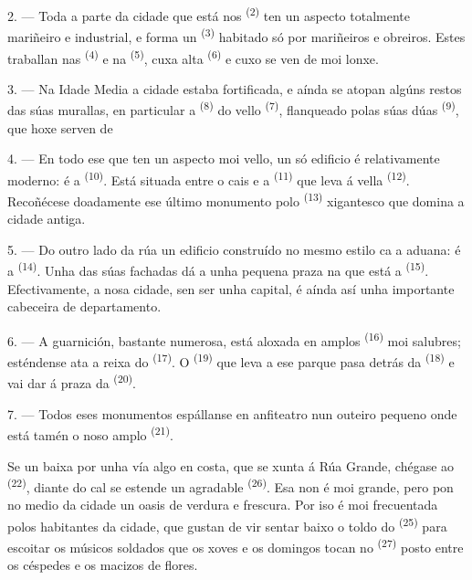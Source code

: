 2. --- Toda a parte da cidade que está nos  \textsuperscript{(2)} ten un
aspecto totalmente mariñeiro e industrial, e forma un 
\textsuperscript{(3)} habitado só por mariñeiros e obreiros. Estes traballan nas
 \textsuperscript{(4)} e na 
\textsuperscript{(5)}, cuxa alta  \textsuperscript{(6)} e cuxo
 se ven de moi lonxe.

3. --- Na Idade Media a cidade estaba fortificada, e aínda se atopan algúns restos das
súas murallas, en particular a  \textsuperscript{(8)} do vello
 \textsuperscript{(7)}, flanqueado polas súas dúas
 \textsuperscript{(9)}, que hoxe serven de 

4. --- En todo ese  que ten un aspecto moi vello, un só edificio é
relativamente moderno: é a  \textsuperscript{(10)}. Está situada entre
o cais e a  \textsuperscript{(11)} que leva á vella  \textsuperscript{(12)}. Recoñécese doadamente ese último monumento polo
 \textsuperscript{(13)} xigantesco que domina a cidade antiga.

5. --- Do outro lado da rúa  un edificio construído no mesmo estilo ca a
aduana: é a  \textsuperscript{(14)}. Unha das súas fachadas dá a unha
pequena praza na que está a  \textsuperscript{(15)}. Efectivamente,
a nosa cidade, sen ser unha capital, é aínda así unha importante cabeceira de
departamento.

\VUsaut{5.0mm}
\VUsaut{3.4mm}

6. --- A guarnición, bastante numerosa, está aloxada en amplos 
\textsuperscript{(16)} moi salubres; esténdense ata a reixa do  \textsuperscript{(17)}. O  \textsuperscript{(19)} que leva
a ese parque pasa detrás da  \textsuperscript{(18)} e vai
dar á praza da  \textsuperscript{(20)}.

7. --- Todos eses monumentos espállanse en anfiteatro nun outeiro pequeno onde está
tamén o noso amplo  \textsuperscript{(21)}.

Se un baixa por unha vía algo en costa, que se xunta á Rúa Grande, chégase ao
 \textsuperscript{(22)}, diante do cal se estende un
agradable  \textsuperscript{(26)}. Esa  non é moi grande, pero pon no medio da cidade un oasis de verdura e
frescura. Por iso é moi frecuentada polos habitantes da cidade, que gustan de vir
sentar baixo o toldo do  \textsuperscript{(25)} para escoitar os músicos
soldados que os xoves e os domingos tocan no 
\textsuperscript{(27)} posto entre os céspedes e os macizos de flores.

